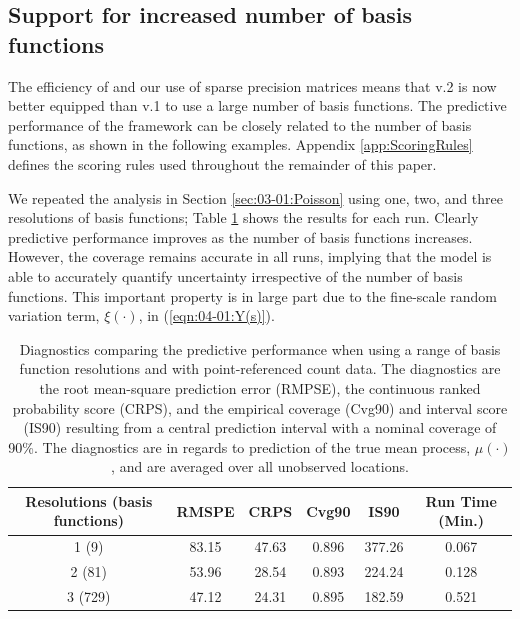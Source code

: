 \documentclass[article]{jss}
\begin{document}
\subsection{Support for increased number of basis functions}\label{sec:3:increased_resolution}

The efficiency of  and our use of sparse precision matrices means that  v.2 is now better equipped than  v.1 to use a large number of basis functions. 
The predictive performance of the framework can be closely related to the number of basis functions, as shown in the following examples. 
Appendix \ref{app:ScoringRules} defines the scoring rules used throughout the remainder of this paper. 



We repeated the analysis in Section \ref{sec:03-01:Poisson} using one, two, and three resolutions of basis functions; Table \ref{tab:03-02:PoissonScoringRules} shows the results for each run. 
Clearly predictive performance improves as the number of basis functions increases. However, the coverage remains accurate in all runs, implying that the model is able to accurately quantify uncertainty irrespective of the number of basis functions. 
 This important property is in large part due to the fine-scale random variation term, $\xi(\cdot)$, in (\ref{eqn:04-01:Y(s)}). 
\begin{table}[t!]
    \centering
    \caption{Diagnostics comparing the predictive performance when using a range of basis function resolutions and with point-referenced count data. The diagnostics are the root mean-square prediction error (RMPSE), the continuous ranked probability score (CRPS), and the empirical coverage (Cvg90) and interval score (IS90) resulting from a central prediction interval with a nominal coverage of 90\%. The diagnostics are in regards to prediction of the true mean process, $\mu(\cdot)$, and are averaged over all unobserved locations.
    }
    \label{tab:03-02:PoissonScoringRules}
    \begin{tabular}{cccccc}
    \hline
    Resolutions (basis functions) & RMSPE  & CRPS & Cvg90 & IS90 & Run Time (Min.) \\
    \hline
    1 (9)    & 83.15    & 47.63 & 0.896  & 377.26  &  0.067  \\
    2 (81)   & 53.96    & 28.54 & 0.893  & 224.24 &  0.128   \\
    3 (729)  & 47.12    & 24.31 & 0.895  & 182.59 &  0.521 \\
    \hline
    \end{tabular}
\end{table}
\end{document}
